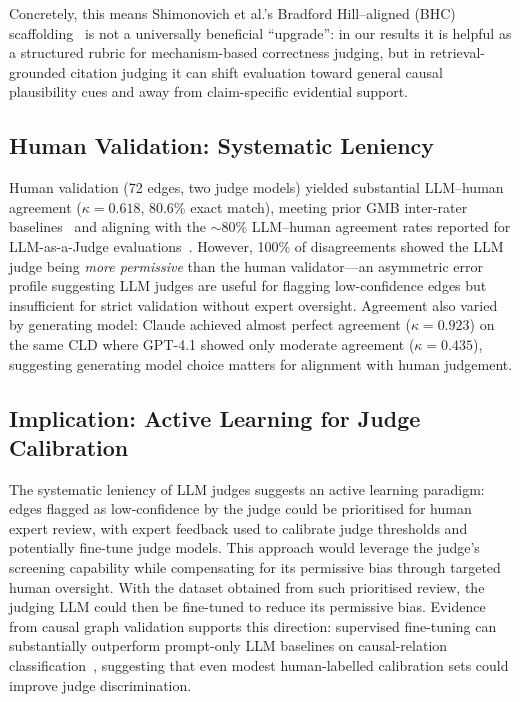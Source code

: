 Concretely, this means Shimonovich et al.'s Bradford Hill--aligned (BHC) scaffolding~\citep{shimonovich2020bradford} is not a universally beneficial ``upgrade'': in our results it is helpful as a structured rubric for mechanism-based correctness judging, but in retrieval-grounded citation judging it can shift evaluation toward general causal plausibility cues and away from claim-specific evidential support.

\subsection{Human Validation: Systematic Leniency}
Human validation (72 edges, two judge models) yielded substantial LLM--human agreement ($\kappa = 0.618$, 80.6\% exact match), meeting prior GMB inter-rater baselines~\citep{landis1977measurement} and aligning with the $\sim$80\% LLM--human agreement rates reported for LLM-as-a-Judge evaluations~\citep{zheng2024judging}. However, 100\% of disagreements showed the LLM judge being \emph{more permissive} than the human validator---an asymmetric error profile suggesting LLM judges are useful for flagging low-confidence edges but insufficient for strict validation without expert oversight. Agreement also varied by generating model: Claude achieved almost perfect agreement ($\kappa = 0.923$) on the same CLD where GPT-4.1 showed only moderate agreement ($\kappa = 0.435$), suggesting generating model choice matters for alignment with human judgement.

\subsection{Implication: Active Learning for Judge Calibration}
The systematic leniency of LLM judges suggests an active learning paradigm: edges flagged as low-confidence by the judge could be prioritised for human expert review, with expert feedback used to calibrate judge thresholds and potentially fine-tune judge models. This approach would leverage the judge's screening capability while compensating for its permissive bias through targeted human oversight. With the dataset obtained from such prioritised review, the judging LLM could then be fine-tuned to reduce its permissive bias. Evidence from causal graph validation supports this direction: supervised fine-tuning can substantially outperform prompt-only LLM baselines on causal-relation classification~\citep{susanti2024prompting}, suggesting that even modest human-labelled calibration sets could improve judge discrimination.

